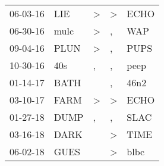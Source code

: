 \begin{supertabular}{p{0.07\textwidth}p{0.06\textwidth}p{0.02\textwidth}p{0.02\textwidth}p{0.06\textwidth}}
 06-03-16\textsuperscript{} &   LIE\textsuperscript{} &  \textgreater &     \textgreater &           ECHO\textsuperscript{} \\
 06-30-16\textsuperscript{} &  mulc\textsuperscript{} &  \textgreater &                , &            WAP\textsuperscript{} \\
 09-04-16\textsuperscript{} &  PLUN\textsuperscript{} &  \textgreater &                , &           PUPS\textsuperscript{} \\
 10-30-16\textsuperscript{} &   40s\textsuperscript{} &             , &                , &           peep\textsuperscript{} \\
 01-14-17\textsuperscript{} &  BATH\textsuperscript{} &               &                , &           46n2\textsuperscript{} \\
 03-10-17\textsuperscript{} &  FARM\textsuperscript{} &  \textgreater &     \textgreater &           ECHO\textsuperscript{} \\
 01-27-18\textsuperscript{} &  DUMP\textsuperscript{} &             , &                , &           SLAC\textsuperscript{} \\
 03-16-18\textsuperscript{} &  DARK\textsuperscript{} &               &     \textgreater &           TIME\textsuperscript{} \\
 06-02-18\textsuperscript{} &  GUES\textsuperscript{} &               &     \textgreater &           blbc\textsuperscript{} \\
\end{supertabular}
